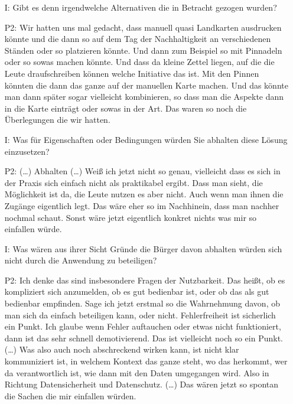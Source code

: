 \begin{itemize}
    \item[I:] Gibt es denn irgendwelche Alternativen die in Betracht gezogen wurden?
    \item[P2:] Wir hatten uns mal gedacht, dass manuell quasi Landkarten ausdrucken k{\"o}nnte und die dann so auf dem Tag der Nachhaltigkeit an verschiedenen St{\"a}nden oder so platzieren k{\"o}nnte. Und dann zum Beispiel so mit Pinnadeln oder so sowas machen k{\"o}nnte. Und dass da kleine Zettel liegen, auf die die Leute draufschreiben k{\"o}nnen welche Initiative das ist. Mit den Pinnen k{\"o}nnten die dann das ganze auf der manuellen Karte machen. Und das k{\"o}nnte man dann sp{\"a}ter sogar vielleicht kombinieren, so dass man die Aspekte dann in die Karte eintr{\"a}gt oder sowas in der Art. Das waren so noch die {\"U}berlegungen die wir hatten.
    \item[I:] Was f{\"u}r Eigenschaften oder Bedingungen w{\"u}rden Sie abhalten diese L{\"o}sung einzusetzen?
    \item[P2:] (\dots) Abhalten (\dots) Wei{\ss} ich jetzt nicht so genau, vielleicht dass es sich in der Praxis sich einfach nicht als praktikabel ergibt. Dass man sieht, die M{\"o}glichkeit ist da, die Leute nutzen es aber nicht. Auch wenn man ihnen die Zug{\"a}nge eigentlich legt. Das w{\"a}re eher so im Nachhinein, dass man nachher nochmal schaut. Sonst w{\"a}re jetzt eigentlich konkret nichts was mir so einfallen w{\"u}rde.
    \item[I:] Was w{\"a}ren aus ihrer Sicht Gr{\"u}nde die B{\"u}rger davon abhalten w{\"u}rden sich nicht durch die Anwendung zu beteiligen?
    \item[P2:] Ich denke das sind insbesondere Fragen der Nutzbarkeit. Das hei{\ss}t, ob es kompliziert sich anzumelden, ob es gut bedienbar ist, oder ob das als gut bedienbar empfinden. Sage ich jetzt erstmal so die Wahrnehmung davon, ob man sich da einfach beteiligen kann, oder nicht. Fehlerfreiheit ist sicherlich ein Punkt. Ich glaube wenn Fehler auftauchen oder etwas nicht funktioniert, dann ist das sehr schnell demotivierend. Das ist vielleicht noch so ein Punkt. (\dots) Was also auch noch abschreckend wirken kann, ist nicht klar kommuniziert ist, in welchem Kontext das ganze steht, wo das herkommt, wer da verantwortlich ist, wie dann mit den Daten umgegangen wird. Also in Richtung Datensicherheit und Datenschutz. (\dots) Das w{\"a}ren jetzt so spontan die Sachen die mir einfallen w{\"u}rden.
\end{itemize}

